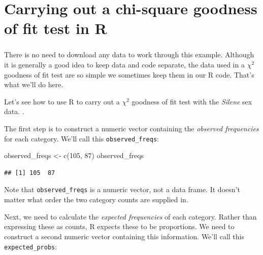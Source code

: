 \documentclass[
]{book}
\newenvironment{Shaded}{\begin{snugshade}}{\end{snugshade}}
\newcommand{\DecValTok}[1]{\textcolor[rgb]{0.00,0.00,0.81}{#1}}
\newcommand{\FunctionTok}[1]{\textcolor[rgb]{0.00,0.00,0.00}{#1}}
\newcommand{\NormalTok}[1]{#1}
\newcommand{\OtherTok}[1]{\textcolor[rgb]{0.56,0.35,0.01}{#1}}
\newenvironment{greybox}{
  \definecolor{shadecolor}{rgb}{0.95,0.95,0.95}  %
  \color{black}
  \begin{shaded}}
 {\end{shaded}}
\newenvironment{infobox}[1]
  {
  \begin{itemize}
  \renewcommand{\labelitemi}{
    \raisebox{-.7\height}[0pt][0pt]{
      {\setkeys{Gin}{width=3em,keepaspectratio}
        \texttt{[image: images/\#1]}}
    }
  }
  \setlength{\fboxsep}{1em}
  \begin{greybox}
  \item
  }
  {
  \end{greybox}
  \end{itemize}
  }
\begin{document}
\hypertarget{carrying-out-a-chi-square-goodness-of-fit-test-in-r}{%
\section{Carrying out a chi-square goodness of fit test in R}\label{carrying-out-a-chi-square-goodness-of-fit-test-in-r}}

\begin{infobox}{action}

\hypertarget{section-17}{%
\subsubsection*{}\label{section-17}}

There is no need to download any data to work through this example. Although it is generally a good idea to keep data and code separate, the data used in a \(\chi^{2}\) goodness of fit test are so simple we sometimes keep them in our R code. That's what we'll do here.

\end{infobox}

Let's see how to use R to carry out a \(\chi^{2}\) goodness of fit test with the \emph{Silene} sex data. .

The first step is to construct a numeric vector containing the \emph{observed frequencies} for each category. We'll call this \texttt{observed\_freqs}:

\begin{Shaded}
\begin{Highlighting}[]
\NormalTok{observed\_freqs }\OtherTok{\textless{}{-}} \FunctionTok{c}\NormalTok{(}\DecValTok{105}\NormalTok{, }\DecValTok{87}\NormalTok{)}
\NormalTok{observed\_freqs}
\end{Highlighting}
\end{Shaded}

\begin{verbatim}
## [1] 105  87
\end{verbatim}

Note that \texttt{observed\_freqs} is a numeric vector, not a data frame. It doesn't matter what order the two category counts are supplied in.

Next, we need to calculate the \emph{expected frequencies} of each category. Rather than expressing these as counts, R expects these to be proportions. We need to construct a second numeric vector containing this information. We'll call this \texttt{expected\_probs}:
\end{document}

